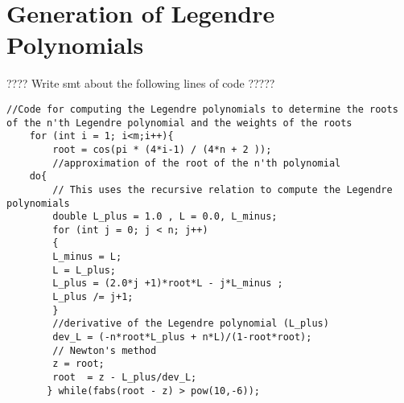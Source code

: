 \section{Generation of Legendre Polynomials}
\label{sec:GenerationOfLegendrePolynomials}
???? Write smt about the following lines of code ?????
\begin{lstlisting}
//Code for computing the Legendre polynomials to determine the roots of the n'th Legendre polynomial and the weights of the roots
    for (int i = 1; i<m;i++){
        root = cos(pi * (4*i-1) / (4*n + 2 ));  
        //approximation of the root of the n'th polynomial
    do{
        // This uses the recursive relation to compute the Legendre polynomials
        double L_plus = 1.0 , L = 0.0, L_minus;
        for (int j = 0; j < n; j++)
        {
        L_minus = L;
        L = L_plus;
        L_plus = (2.0*j +1)*root*L - j*L_minus ;
        L_plus /= j+1;
        }
		//derivative of the Legendre polynomial (L_plus)
        dev_L = (-n*root*L_plus + n*L)/(1-root*root);   
        // Newton's method
        z = root;
        root  = z - L_plus/dev_L;                   
       } while(fabs(root - z) > pow(10,-6));
\end{lstlisting}